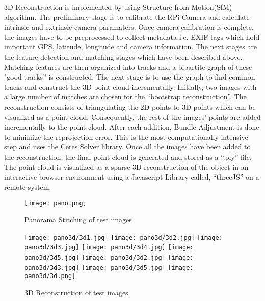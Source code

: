 \newline
 3D-Reconstruction is implemented by using Structure from Motion(SfM) algorithm. The preliminary stage is to calibrate the RPi Camera and calculate intrinsic and extrinsic camera paramaters. Once camera calibration is complete, the images have to be preprocessed to collect metadata i.e. EXIF tags which hold important GPS, latitude, longitude and camera information. The next stages are the feature detection and matching stages which have been described above. Matching features are then organized into tracks and a bipartite graph of these "good tracks” is constructed. The next stage is to use the graph to find common tracks and construct the 3D point cloud incrementally. Initially, two images with a large number of matches are chosen for the “bootstrap reconstruction”. The reconstruction consists of triangulating the 2D points to 3D points which can be visualized as a point cloud. Consequently, the rest of the images' points are added incrementally to the point cloud. After each addition, Bundle Adjustment is done to minimize the reprojection error. This is the most computationally-intensive step and uses the Ceres Solver library. Once all the images have been added to the reconstruction, the final point cloud is generated and stored as a “.ply” file. The point cloud is visualized as a sparse 3D reconstruction of the object in an interactive browser environment using a Javascript Library called, “threeJS” on a remote system.   

\begin{figure}[H]
  \centering
  \texttt{[image: pano.png]}
  \caption{Panorama Stitching of test images}
  \label{pano}	
\end{figure}

\begin{figure}[H]
  \centering
  \texttt{[image: pano3d/3d1.jpg]}
  \texttt{[image: pano3d/3d2.jpg]}
  \texttt{[image: pano3d/3d3.jpg]}
  \texttt{[image: pano3d/3d4.jpg]}
  \texttt{[image: pano3d/3d5.jpg]}
  \texttt{[image: pano3d/3d2.jpg]}
  \texttt{[image: pano3d/3d3.jpg]}
  \texttt{[image: pano3d/3d5.jpg]}
  \texttt{[image: pano3d/3d.png]}
  \caption{3D Reconstruction of test images}
  \label{recon}	
\end{figure}

\pagebreak
